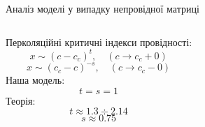 \documentclass[10pt]{beamer}
\begin{document}
\begin{frame}{Аналіз моделі у випадку непровідної матриці}
\begin{columns}[T,onlytextwidth]
        \vspace{8pt}
        Перколяційні критичні індекси провідності:
        $$x \sim (c-c_c)^t, \quad (c \to c_c+0)$$
        $$x \sim (c_c-c)^{-s}, \quad (c \to c_c-0)$$
        Наша модель:
        $$
            t=s=1
        $$
        Теорія:
        $$
            t \approx 1.3 \div 2.14
        $$
        $$
            s \approx 0.75
        $$
      
\end{columns}

\end{frame}
\end{document}
